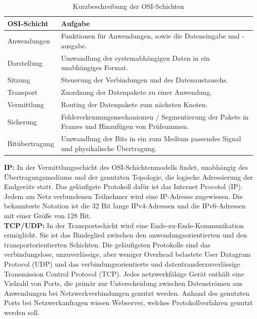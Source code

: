 \newpage

\begin{table}[tbt]
\caption[Kurzbeschreibung der OSI-Schichten]{Kurzbeschreibung der OSI-Schichten \cite{ekOSI}}
\label{tab:OSISchichtenbeschreibung}
\begin{center}
    \begin{tabular}{ l  p{8cm} }
    \toprule
     OSI-Schicht & Aufgabe \\ 
     \midrule
        
    Anwendungen & Funktionen für Anwendungen, sowie die Dateneingabe und -ausgabe. \\

    Darstellung & Umwandlung der systemabhängigen Daten in ein unabhängiges Format.  \\

    Sitzung & Steuerung der Verbindungen und des Datenaustauschs.  \\

    Transport & Zuordnung der Datenpakete zu einer Anwendung. \\
    
	Vermittlung & Routing der Datenpakete zum nächsten Knoten. \\
	
	Sicherung & Fehlererkennungsmechanismen / Segmentierung der Pakete in Frames und Hinzufügen von Prüfsummen.  \\
    
    Bitübertragung & Umwandlung der Bits in ein zum Medium passendes Signal und physikalische Übertragung.\\ 
    \bottomrule
    \end{tabular}
\end{center}
\end{table}

\noindent
{}
\textbf{IP:}
In der Vermittlungsschicht des OSI-Schichtenmodells findet, unabhängig des Über\-tra\-gungs\-mediums und der genutzten Topologie, die logische Adressierung der Endgeräte statt. Das geläufigste Protokoll dafür ist das Internet Procotol (IP). Jedem am Netz verbundenen Teilnehmer wird eine IP-Adresse zugewiesen. Die bekannteste Notation ist die 32 Bit lange IPv4-Adressen und die IPv6-Adressen mit einer Größe von 128 Bit.\\

\noindent
{}
\textbf{TCP/UDP:}
In der Transportschicht wird eine Ende-zu-Ende-Kommunikation ermöglicht. Sie ist das Bindeglied zwischen den anwendungsorientierten und den transportorientierten Schichten. Die geläufigsten Protokolle sind das verbindungslose, unzuverlässige, aber weniger Overhead belastete User Datagram Protocol (UDP) und das verbindungsorientierte und datentransferzuverlässige Transmission Control Protocol (TCP). Jedes netzwerkfähige Gerät enthält eine Vielzahl von Ports, die primär zur
Unterscheidung zwischen Datenströmen aus Anwendungen bei Netzwerkverbindungen
genutzt werden. Anhand des genutzten Ports bei Netzwerkanfragen
wissen Webserver, welches Protokollverfahren genutzt werden soll.

